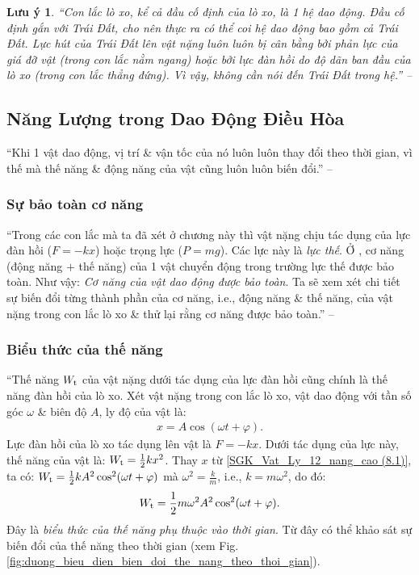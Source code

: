 \documentclass{article}
\numberwithin{equation}{section}
\newtheorem{luuy}{Lưu ý}[section]
\begin{document}
\begin{luuy}
	``Con lắc lò xo, kể cả đầu cố định của lò xo, là 1 hệ dao động. Đầu cố định gắn với Trái Đất, cho nên thực ra có thể coi hệ dao động bao gồm cả Trái Đất. Lực hút của Trái Đất lên vật nặng luôn luôn bị cân bằng bởi phản lực của giá đỡ vật (trong con lắc nằm ngang) hoặc bởi lực đàn hồi do độ dãn ban đầu của lò xo (trong con lắc thẳng đứng). Vì vậy, không cần nói đến Trái Đất trong hệ.'' -- \cite[pp. 39--40]{SGK_Vat_Ly_12_nang_cao}
\end{luuy}


\subsection{Năng Lượng trong Dao Động Điều Hòa}
``Khi 1 vật dao động, vị trí \& vận tốc của nó luôn luôn thay đổi theo thời gian, vì thế mà thế năng \& động năng của vật cũng luôn luôn biến đổi.'' -- \cite[p. 41]{SGK_Vat_Ly_12_nang_cao}

\subsubsection{Sự bảo toàn cơ năng}
``Trong các con lắc mà ta đã xét ở chương này thì vật nặng chịu tác dụng của lực đàn hồi ($F = -kx$) hoặc trọng lực ($P = mg$). Các lực này là \textit{lực thế}. Ở \cite{SGK_Vat_Ly_10_nang_cao}, cơ năng (động năng $+$ thế năng) của 1 vật chuyển động trong trường lực thế được bảo toàn. Như vậy: \textit{Cơ năng của vật dao động được bảo toàn}. Ta sẽ xem xét chi tiết sự biến đổi từng thành phần của cơ năng, i.e., động năng \& thế năng, của vật nặng trong con lắc lò xo \& thử lại rằng cơ năng được bảo toàn.'' -- \cite[p. 41]{SGK_Vat_Ly_12_nang_cao}

\subsubsection{Biểu thức của thế năng}
``Thế năng $W_{\rm t}$ của vật nặng dưới tác dụng của lực đàn hồi cũng chính là thế năng đàn hồi của lò xo. Xét vật nặng trong con lắc lò xo, vật dao động với tần số góc $\omega$ \& biên độ $A$, ly độ của vật là:
\begin{align}
	\label{SGK_Vat_Ly_12_nang_cao (8.1)}
	x = A\cos(\omega t + \varphi).
\end{align}
Lực đàn hồi của lò xo tác dụng lên vật là $F = -kx$. Dưới tác dụng của lực này, thế năng của vật là: $W_{\rm t} = \frac{1}{2}kx^2$. Thay $x$ từ \eqref{SGK_Vat_Ly_12_nang_cao (8.1)}, ta có: $W_{\rm t} = \frac{1}{2}kA^2\cos^2(\omega t + \varphi)$ mà $\omega^2 = \frac{k}{m}$, i.e., $k = m\omega^2$, do đó:
\begin{align}
	\label{SGK_Vat_Ly_12_nang_cao (8.2)}
	W_{\rm t} = \frac{1}{2}m\omega^2A^2\cos^2(\omega t + \varphi).
\end{align}
Đây là \textit{biểu thức của thế năng phụ thuộc vào thời gian}. Từ đây có thể khảo sát sự biến đổi của thế năng theo thời gian (xem Fig. \ref{fig:duong_bieu_dien_bien_doi_the_nang_theo_thoi_gian}).
\end{document}
